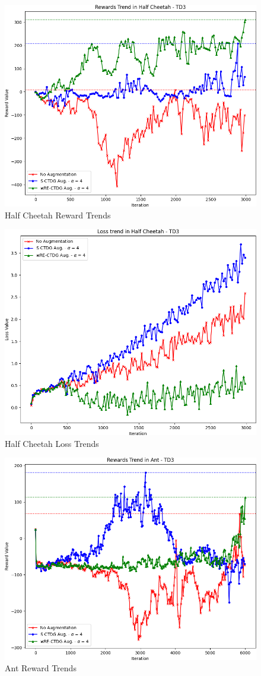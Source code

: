 \begin{figure}[h]
    \centering
    \includegraphics[width=.8\textwidth]{figures/ch5/rew_halfcheetah.png}
    \caption{Half Cheetah Reward Trends}
    \label{fig:rew_cheetah}
\end{figure}

\begin{figure}[h]
    \centering
    \includegraphics[width=.8\textwidth]{figures/ch5/loss_halfcheetah.png}
    \caption{Half Cheetah Loss Trends}
    \label{fig:loss_cheetah}
\end{figure}

\begin{figure}[h]
    \centering
    \includegraphics[width=.8\textwidth]{figures/ch5/rew_ant.png}
    \caption{Ant Reward Trends}
    \label{fig:rew_ant}
\end{figure}

